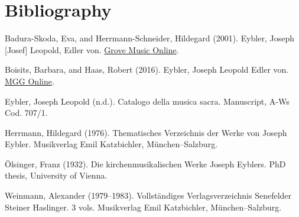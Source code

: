 \documentclass{ees}
\begin{document}
\section{Bibliography}

\begin{bulletlist}
  \item Badura-Skoda, Eva, and Herrmann-Schneider, Hildegard (2001). Eybler, Joseph [Josef] Leopold, Edler von. \href{https://doi.org/10.1093/gmo/9781561592630.article.40047}{Grove Music Online}.
  \item Boisits, Barbara, and Haas, Robert (2016). Eybler, Joseph Leopold Edler von. \href{https://www.mgg-online.com/mgg/stable/13179}{MGG Online}.
  \item Eybler, Joseph Leopold (n.d.). Catalogo della musica sacra. Manuscript, A-Ws Cod. 707/1.
  \item Herrmann, Hildegard (1976). Thematisches Verzeichnis der Werke von Joseph Eybler. Musikverlag Emil Katzbichler, München–Salzburg.
  \item Ölsinger, Franz (1932). Die kirchenmusikalischen Werke Joseph Eyblers. PhD thesis, University of Vienna.
  \item Weinmann, Alexander (1979–1983). Vollständiges Verlagsverzeichnis Senefelder Steiner Haslinger. 3 vols. Musikverlag Emil Katzbichler, München–Salzburg.
\end{bulletlist}

\clearpage
{}
\end{document}
